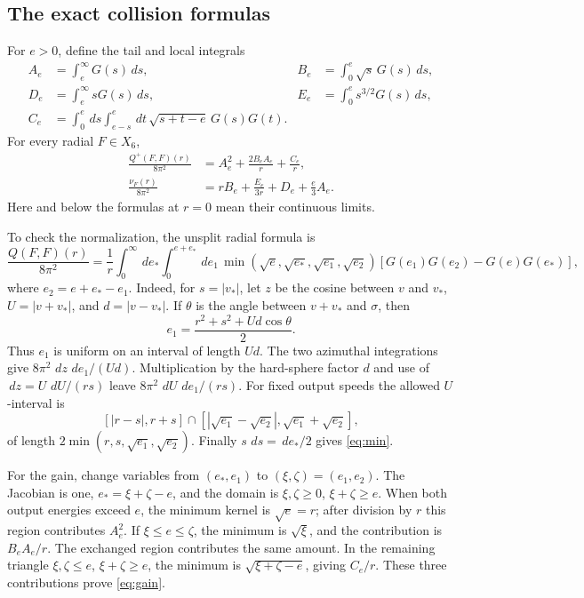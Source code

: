 \documentclass[11pt,a4paper]{article}
\numberwithin{equation}{section}
\theoremstyle{remark}
\newcommand{\dd}{\,d}
\begin{document}
\subsection*{The exact collision formulas}
For \(e>0\), define the tail and local integrals
\begin{align*}
 A_e&=\int_e^\infty G(s)\dd s,&
 B_e&=\int_0^e\sqrt s\,G(s)\dd s,\\
 D_e&=\int_e^\infty sG(s)\dd s,&
 E_e&=\int_0^e s^{3/2}G(s)\dd s,\\
 C_e&=\int_0^e\dd s\int_{e-s}^e\dd t\,
        \sqrt{s+t-e}\,G(s)G(t).
\end{align*}
For every radial \(F\in X_6\),
\begin{align}
 \frac{Q^+(F,F)(r)}{8\pi^2}
   &=A_e^2+\frac{2B_eA_e}{r}+\frac{C_e}{r},\label{eq:gain}\\
 \frac{\nu_F(r)}{8\pi^2}
   &=rB_e+\frac{E_e}{3r}+D_e+\frac e3A_e.\label{eq:loss}
\end{align}
Here and below the formulas at \(r=0\) mean their continuous limits.

To check the normalization, the unsplit radial formula is
\begin{equation}\label{eq:min}
 \frac{Q(F,F)(r)}{8\pi^2}
 =\frac1r\int_0^\infty\dd e_*\int_0^{e+e_*}\dd e_1\,
 \min(\sqrt e,\sqrt{e_*},\sqrt{e_1},\sqrt{e_2})
 [G(e_1)G(e_2)-G(e)G(e_*)],
\end{equation}
where \(e_2=e+e_*-e_1\).
Indeed, for \(s=|v_*|\), let \(z\) be the cosine between \(v\) and
\(v_*\), \(U=|v+v_*|\), and \(d=|v-v_*|\).
If \(\theta\) is the angle between \(v+v_*\) and \(\sigma\), then
\[
 e_1=\frac{r^2+s^2+Ud\cos\theta}{2}.
\]
Thus \(e_1\) is uniform on an interval of length \(Ud\).
The two azimuthal integrations
give \(8\pi^2\,\dd z\,\dd e_1/(Ud)\). Multiplication by the hard-sphere
factor \(d\) and use of \(\dd z=U\,\dd U/(rs)\) leave
\(8\pi^2\,\dd U\,\dd e_1/(rs)\). For fixed output speeds the allowed
\(U\)-interval is
\[
 [|r-s|,r+s]\cap
 [|\sqrt{e_1}-\sqrt{e_2}|,\sqrt{e_1}+\sqrt{e_2}],
\]
of length \(2\min(r,s,\sqrt{e_1},\sqrt{e_2})\).
Finally \(s\,\dd s=\dd e_*/2\) gives \eqref{eq:min}.

For the gain, change variables from \((e_*,e_1)\) to
\((\xi,\zeta)=(e_1,e_2)\). The Jacobian is one,
\(e_*=\xi+\zeta-e\), and the domain is
\(\xi,\zeta\geq0\), \(\xi+\zeta\geq e\).
When both output energies exceed \(e\), the minimum kernel is \(\sqrt e=r\);
after division by \(r\) this region contributes \(A_e^2\).
If \(\xi\leq e\leq\zeta\), the minimum is \(\sqrt\xi\), and the
contribution is \(B_eA_e/r\). The exchanged region contributes the
same amount. In the remaining triangle
\(\xi,\zeta\leq e\), \(\xi+\zeta\geq e\), the minimum is
\(\sqrt{\xi+\zeta-e}\), giving \(C_e/r\).
These three contributions prove \eqref{eq:gain}.
\end{document}
